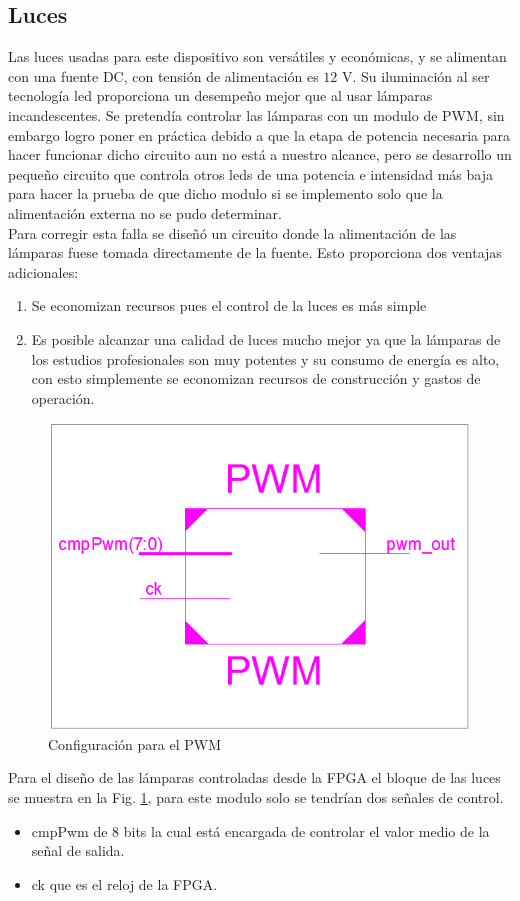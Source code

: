 \documentclass[twocolumn]{IEEEtran}
\begin{document}
\subsection{Luces}
\noindent
Las luces usadas para este dispositivo son versátiles y económicas, y se alimentan con  una fuente DC, con tensión de alimentación es $12$ V.  Su iluminación al ser tecnología led proporciona un desempeño mejor que al usar lámparas incandescentes. Se pretendía controlar las lámparas con un modulo de PWM, sin embargo logro poner en práctica debido a que la etapa de potencia necesaria para hacer funcionar dicho circuito aun no está a nuestro alcance, pero se desarrollo un pequeño circuito que controla  otros leds  de una potencia e intensidad más baja para hacer la prueba de que dicho modulo si se implemento solo que la alimentación externa no se pudo determinar.\\
Para corregir esta falla se diseñó un circuito donde la alimentación de las lámparas fuese tomada directamente de la fuente. Esto proporciona dos ventajas adicionales:
\begin{enumerate}
 \item Se economizan recursos pues el control de la luces es más simple
 \item Es posible alcanzar una calidad de luces mucho mejor ya que la lámparas de los estudios profesionales son muy potentes y su consumo de energía es alto, con esto simplemente se economizan recursos de construcción y gastos de operación.
\end{enumerate}
\begin{figure}[H]
	\centering
		\includegraphics[scale=0.45]{pwm.png}
	\caption{Configuración para el PWM}
	\label{fig7}
\end{figure}
\noindent
Para el diseño de las lámparas controladas desde la FPGA el bloque de las luces se muestra en la Fig. \ref{fig7}, para este modulo solo se tendrían dos señales de control.\\
\begin{itemize}
 \item cmpPwm de 8 bits la cual está encargada de controlar el valor medio de la señal de salida.
 \item ck que es el reloj de la FPGA.
\end{itemize}
\end{document}
